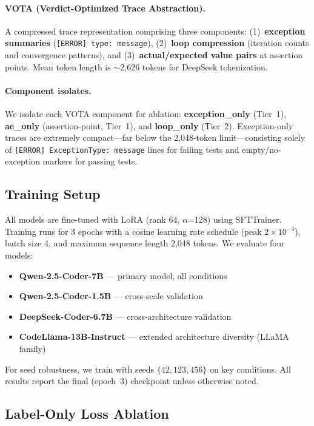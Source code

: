 \documentclass[11pt]{article}
\begin{document}
\paragraph{VOTA (Verdict-Optimized Trace Abstraction).}
A compressed trace representation comprising three components: (1)~\textbf{exception summaries} (\texttt{[ERROR] type: message}), (2)~\textbf{loop compression} (iteration counts and convergence patterns), and (3)~\textbf{actual/expected value pairs} at assertion points.
Mean token length is ${\sim}$2{,}626 tokens for DeepSeek tokenization.

\paragraph{Component isolates.}
We isolate each VOTA component for ablation: \textbf{exception\_only} (Tier~1), \textbf{ae\_only} (assertion-point, Tier~1), and \textbf{loop\_only} (Tier~2).
Exception-only traces are extremely compact---far below the 2{,}048-token limit---consisting solely of \texttt{[ERROR] ExceptionType: message} lines for failing tests and empty/no-exception markers for passing tests.

\subsection{Training Setup}
\label{sec:training}

All models are fine-tuned with LoRA (rank 64, $\alpha$=128) using SFTTrainer.
Training runs for 3 epochs with a cosine learning rate schedule (peak $2 \times 10^{-4}$), batch size 4, and maximum sequence length 2{,}048 tokens.
We evaluate four models:
\begin{itemize}[nosep,leftmargin=*]
  \item \textbf{Qwen-2.5-Coder-7B} --- primary model, all conditions
  \item \textbf{Qwen-2.5-Coder-1.5B} --- cross-scale validation
  \item \textbf{DeepSeek-Coder-6.7B} --- cross-architecture validation
  \item \textbf{CodeLlama-13B-Instruct} --- extended architecture diversity (LLaMA family)
\end{itemize}

For seed robustness, we train with seeds $\{42, 123, 456\}$ on key conditions.
All results report the final (epoch~3) checkpoint unless otherwise noted.

\subsection{Label-Only Loss Ablation}
\label{sec:label_only}
\end{document}
